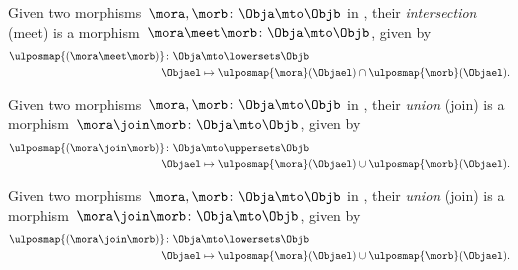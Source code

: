 \begin{definition}
Given two morphisms~$\mora,\morb\colon \Obja \mto \Objb$ in \LPos, their \emph{intersection} (meet) is a morphism~$\mora \meet \morb \colon \Obja \mto \Objb$, given by
\begin{equation*}
\begin{aligned}
\ulposmap{(\mora \meet \morb)}\colon \Obja &\mto \lowersets \Objb\\
\Objael&\mapsto \ulposmap{\mora}(\Objael) \cap \ulposmap{\morb}(\Objael).
\end{aligned}
\end{equation*}
\end{definition}

\begin{definition}
Given two morphisms~$\mora,\morb\colon \Obja \mto \Objb$ in \UPos, their \emph{union} (join) is a morphism~$\mora \join \morb \colon \Obja \mto \Objb$, given by
\begin{equation*}
\begin{aligned}
\ulposmap{(\mora \join \morb)}\colon \Obja &\mto \uppersets \Objb\\
\Objael&\mapsto \ulposmap{\mora}(\Objael) \cup \ulposmap{\morb}(\Objael).
\end{aligned}
\end{equation*}
\end{definition}

\begin{definition}
Given two morphisms~$\mora,\morb\colon \Obja \mto \Objb$ in \LPos, their \emph{union} (join) is a morphism~$\mora \join \morb \colon \Obja \mto \Objb$, given by
\begin{equation*}
\begin{aligned}
\ulposmap{(\mora \join \morb)}\colon \Obja &\mto \lowersets \Objb\\
\Objael&\mapsto \ulposmap{\mora}(\Objael) \cup \ulposmap{\morb}(\Objael).
\end{aligned}
\end{equation*}
\end{definition}

